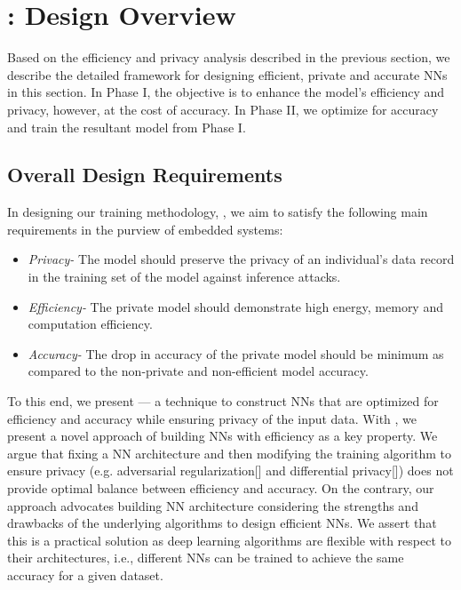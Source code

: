 \section{\method: Design Overview}\label{design}

Based on the efficiency and privacy analysis described in the previous section, we describe the detailed \method\hspace{0.02in} framework for designing efficient, private and accurate NNs in this section.
In Phase I, the objective is to enhance the model's efficiency and privacy, however, at the cost of accuracy.
In Phase II, we optimize for accuracy and train the resultant model from Phase I.


\subsection{Overall Design Requirements}

In designing our training methodology, \method, we aim to satisfy the following main requirements in the purview of embedded systems:

\begin{itemize}[leftmargin=*]

\item {\em Privacy-}
The model should preserve the privacy of an individual's data record in the training set of the model against inference attacks.

\item {\em Efficiency-}
The private model should demonstrate high energy, memory and computation efficiency.

\item {\em Accuracy-}
The drop in accuracy of the private model should be minimum as compared to the non-private and non-efficient model accuracy.
\end{itemize}

To this end, we present \method --- a technique to construct NNs that are optimized for efficiency and accuracy while ensuring privacy of the input data.
With \method, we present a novel approach of building NNs with efficiency as a key property.
We argue that fixing a NN architecture and then modifying the training algorithm to ensure privacy (e.g. adversarial regularization[] and differential privacy[]) does not provide optimal balance between efficiency and accuracy.
On the contrary, our approach advocates building NN architecture considering the strengths and drawbacks of the underlying algorithms to design efficient NNs.
We assert that this is a practical solution as deep learning algorithms are flexible with respect to their architectures, i.e., different NNs can be trained to achieve the same accuracy for a given dataset.




